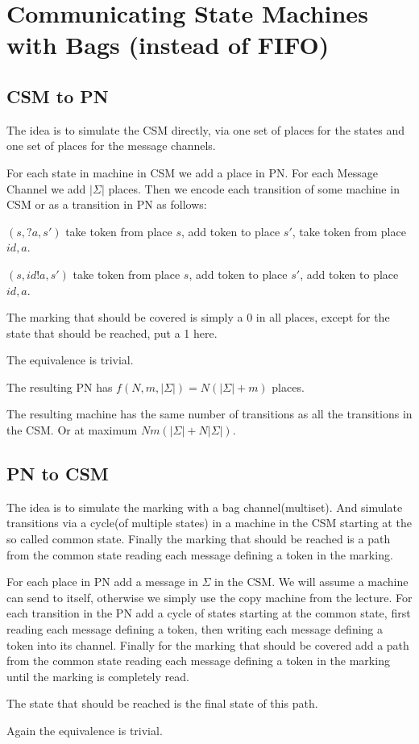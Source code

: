 \section{Communicating State Machines with Bags (instead of FIFO)}

\subsection{CSM to PN}

The idea is to simulate the CSM directly, via one set of places for the states and one set of places for the message channels.

For each state in machine in CSM we add a place in PN. For each Message Channel we add $|\Sigma|$ places. Then we encode each transition of some machine in CSM or as a transition in PN as follows:

$(s,?a,s')$ take token from place $s$, add token to place $s'$, take token from place $id,a$.

$(s,id!a,s')$ take token from place $s$, add token to place $s'$, add token to place $id,a$.

The marking that should be covered is simply a 0 in all places, except for the state that should be reached, put a 1 here.

The equivalence is trivial.

The resulting PN has $f(N,m,|\Sigma|)=N(|\Sigma|+m)$ places.

The resulting machine has the same number of transitions as all the transitions in the CSM. Or at maximum $Nm(|\Sigma|+N|\Sigma|)$.

\subsection{PN to CSM}

The idea is to simulate the marking with a bag channel(multiset). And simulate transitions via a cycle(of multiple states) in a machine in the CSM starting at the so called common state. Finally the marking that should be reached is a path from the common state reading each message defining a token in the marking.

For each place in PN add a message in $\Sigma$ in the CSM. We will assume a machine can send to itself, otherwise we simply use the copy machine from the lecture. For each transition in the PN add a cycle of states starting at the common state, first reading each message defining a token, then writing each message defining a token into its channel. Finally for the marking that should be covered add a path from the common state reading each message defining a token in the marking until the marking is completely read.

The state that should be reached is the final state of this path.

Again the equivalence is trivial.